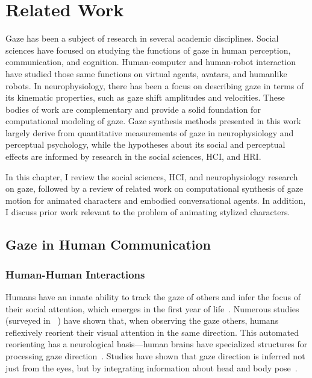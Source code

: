 \pagestyle{deposit}

\chapter{Related Work}

Gaze has been a subject of research in several academic disciplines. Social sciences have focused on studying the functions of gaze in human perception, communication, and cognition. Human-computer and human-robot interaction have studied those same functions on virtual agents, avatars, and humanlike robots. In neurophysiology, there has been a focus on describing gaze in terms of its kinematic properties, such as gaze shift amplitudes and velocities. These bodies of work are complementary and provide a solid foundation for computational modeling of gaze. Gaze synthesis methods presented in this work largely derive from quantitative measurements of gaze in neurophysiology and perceptual psychology, while the hypotheses about its social and perceptual effects are informed by research in the social sciences, HCI, and HRI.

In this chapter, I review the social sciences, HCI, and neurophysiology research on gaze, followed by a review of related work on computational synthesis of gaze motion for animated characters and embodied conversational agents. In addition, I discuss prior work relevant to the problem of animating stylized characters.

\section{Gaze in Human Communication}
\label{sec:GazeHumanCommunication}

\subsection{Human-Human Interactions}

Humans have an innate ability to track the gaze of others and infer the focus of their social attention, which emerges in the first year of life~\citep{scaife1975infant,vecera1995detection}. Numerous studies (surveyed in ~\citep{langton2000eyes}) have shown that, when observing the gaze others, humans reflexively reorient their visual attention in the same direction. This automated reorienting has a neurological basis---human brains have specialized structures for processing gaze direction~\citep{emery2000eyes}. Studies have shown that gaze direction is inferred not just from the eyes, but by integrating information about head and body pose~\citep{hietanen1999does,langton2000eyes,hietanen2002social,pomianowska2011socialcues}.

